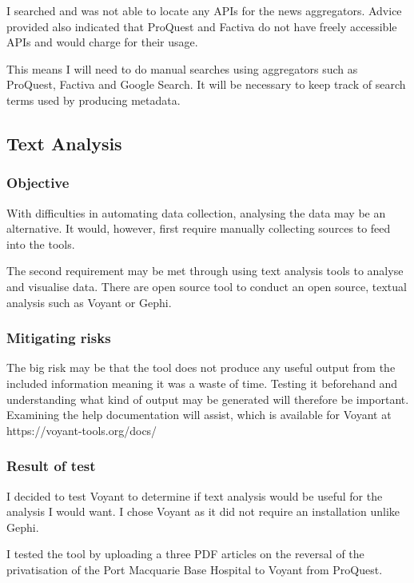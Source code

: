 \documentclass{article}
\begin{document}
I searched and was not able to locate any APIs for the news aggregators. Advice provided also indicated that ProQuest and Factiva do not have freely accessible APIs and would charge for their usage.

This means I will need to do manual searches using aggregators such as ProQuest, Factiva and Google Search. It will be necessary to keep track of search terms used by producing metadata.

\subsection*{Text Analysis}
\subsubsection*{Objective}

With difficulties in automating data collection, analysing the data may be an alternative. It would, however, first require manually collecting sources to feed into the tools.\par  

The second requirement may be met through using text analysis tools to analyse and visualise data. There are open source tool to conduct an open source, textual analysis such as Voyant or Gephi.

\subsubsection*{Mitigating risks}

The big risk may be that the tool does not produce any useful output from the included information meaning it was a waste of time. Testing it beforehand and understanding what kind of output may be generated will therefore be important. Examining the help documentation will assist, which is available for Voyant at https://voyant-tools.org/docs/\par

\subsubsection*{Result of test}

I decided to test Voyant to determine if text analysis would be useful for the analysis I would want. I chose Voyant as it did not require an installation unlike Gephi.

I tested the tool by uploading a three PDF articles on the reversal of the privatisation of the Port Macquarie Base Hospital to Voyant from ProQuest.
\end{document}
